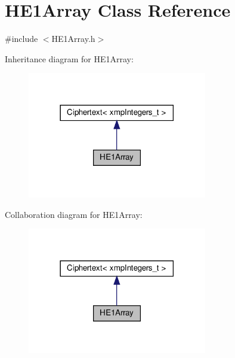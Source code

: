 \hypertarget{classHE1Array}{}\section{H\+E1\+Array Class Reference}
\label{classHE1Array}


{\ttfamily \#include $<$H\+E1\+Array.\+h$>$}



Inheritance diagram for H\+E1\+Array\+:
\nopagebreak
\begin{figure}[H]
\begin{center}
\leavevmode
\includegraphics[width=222pt]{classHE1Array__inherit__graph}
\end{center}
\end{figure}


Collaboration diagram for H\+E1\+Array\+:
\nopagebreak
\begin{figure}[H]
\begin{center}
\leavevmode
\includegraphics[width=222pt]{classHE1Array__coll__graph}
\end{center}
\end{figure}
